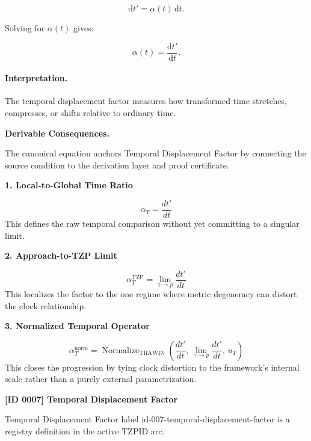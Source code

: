 \begin{equation}
\mathrm{d}t' = \alpha(t)\,\mathrm{d}t .
\end{equation}

Solving for $\alpha(t)$ gives:

\begin{equation}
\boxed{
\alpha(t)=\frac{\mathrm{d}t'}{\mathrm{d}t}.
}
\end{equation}

\paragraph{Interpretation.}
The temporal displacement factor measures how transformed time stretches, compresses, or shifts relative to ordinary time.

\par\vspace{0.35em}
\noindent\textbf{Derivable Consequences.}\quad
\begingroup
\footnotesize
\raggedright
The canonical equation anchors Temporal Displacement Factor by connecting the source condition to the derivation layer and proof certificate.
\par\endgroup

\noindent\textbf{1. Local-to-Global Time Ratio}\par
\[
\alpha_{T}
=
\frac{dt'}{dt}
\]
\noindent This defines the raw temporal comparison without yet committing to a singular limit.\par
\noindent\textbf{2. Approach-to-TZP Limit}\par
\[
\alpha_{T}^{\mathrm{TZP}}
=
\lim_{\gamma \to p} \frac{dt'}{dt}
\]
\noindent This localizes the factor to the one regime where metric degeneracy can distort the clock relationship.\par
\noindent\textbf{3. Normalized Temporal Operator}\par
\[
\alpha_{T}^{\mathrm{norm}}
=
\operatorname{Normalize}_{\mathrm{TRAWIN}}
\!\left(
\frac{dt'}{dt},\,
\lim_{\gamma \to p}\frac{dt'}{dt},\,
u_{T}
\right)
\]
\noindent This closes the progression by tying clock distortion to the framework's internal scale rather than a purely external parametrization.\par

\clearpage
\noindent\textbf{[ID 0007] Temporal Displacement Factor}\par
\vspace{0.35em}
\begingroup\small
{}
Temporal Displacement Factor label id-007-temporal-displacement-factor is a registry definition in the active TZPID arc.

